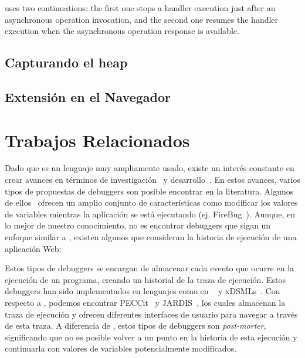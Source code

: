 \documentclass[conference]{IEEEtran}
\begin{document}
\synccc uses two continuations: the first one stops a handler execution just
after an asynchronous operation invocation, and the second one resumes the
handler execution when the asynchronous operation response is available.

\subsection{Capturando el heap}
\label{sec:heap}


\subsection{Extensi\'on en el Navegador}


\bigskip

\section{Trabajos Relacionados}
\label{sec:rw}

Dado que \javascript es un lenguaje muy ampliamente usado, existe un inter\'es constante en crear avances en t\'erminos de investigaci\'on~\cite{vazquesAl:ist2018,legerAl:scp2013,legerAl:scp2015,zhengAl:www2011,chargueraudAl:www2018} y desarrollo~\cite{resig:jquery,angular,mckenzie:babel,rxjs}. En estos avances, varios tipos de propuestas de debuggers son posible encontrar en la literatura. Algunos de ellos~\cite{bartonOdvarko:www2011,jsbin,nodejsInspector} ofrecen un amplio conjunto de caracter\'isticas como modificar los valores de variables mientras la aplicaci\'on se est\'a ejecutando (ej. FireBug~\cite{bartonOdvarko:www2011}). Aunque, en lo mejor de nuestro conocimiento, no es encontrar debuggers que sigan un enfoque similar a \deloreanjs, existen algunos que consideran la historia de ejecuci\'on de una aplicaci\'on Web:       

\smallskip

 Estos tipos de debuggers se encargan de almacenar cada evento que ocurre en la ejecuci\'on de un programa, creando un historial de la traza de ejecuci\'on. Estos debuggers han sido implementados en lenguajes como en \java~\cite{tod:oopsla2007} y     xDSMLs~\cite{bousseAl:SLE2015}. Con respecto a  \javascript, podemos encontrar PECCit~\cite{azar:2016} y JARDIS~\cite{barrAl:fse2016}, los cuales almacenan la traza de ejecuci\'on y ofrecen diferentes interfaces de usuario para navegar a trav\'es de esta traza. A diferencia de \deloreanjs, estos tipos de debuggers son {\em post-morter}, significando que no es posible volver a un punto en la historia de esta ejecuci\'on y continuarla con valores de variables potencialmente modificados. 
\end{document}
